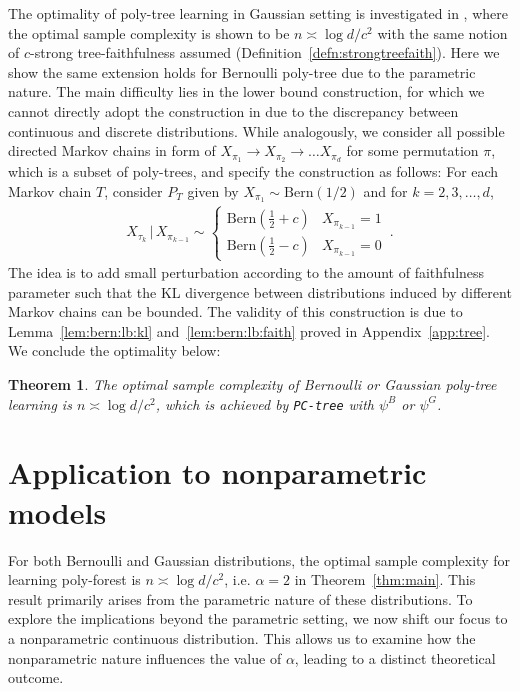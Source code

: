 \documentclass{article}
\newtheorem{theorem}{Theorem}[section]
\theoremstyle{definition}
\theoremstyle{definition}
\theoremstyle{definition}
\theoremstyle{definition}
\theoremstyle{definition}
\theoremstyle{definition}
\theoremstyle{remark}
\theoremstyle{remark}
\newcommand{\given}{\,|\,}
\newcommand{\dd}{d}
\begin{document}
The optimality of poly-tree learning in Gaussian setting is investigated in \citet{wang2024optimal}, where the optimal sample complexity is shown to be $n\asymp\log\dd / c^2$ with the same notion of $c$-strong tree-faithfulness assumed (Definition~\ref{defn:strongtreefaith}).
Here we show the same extension holds for Bernoulli poly-tree due to the parametric nature.
The main difficulty lies in the lower bound construction, for which we cannot directly adopt the construction in \citet{wang2024optimal} due to the discrepancy between continuous and discrete distributions.
While analogously, we consider all possible directed Markov chains in form of $X_{\pi_1}\to X_{\pi_2}\to \ldots X_{\pi_d}$ for some permutation $\pi$, which is a subset of poly-trees, and specify the construction as follows:
For each Markov chain $T$, consider $P_T$ given by $X_{\pi_1}\sim\text{Bern}(1/2)$ and for $k=2,3,\ldots,d$,
\begin{align}\label{eq:pltr:lb}
    X_{\tau_k} \given X_{\pi_{k-1}} \sim\begin{cases}
        \text{Bern}(\frac{1}{2}+c) & X_{\pi_{k-1}}=1 \\
        \text{Bern}(\frac{1}{2}-c) & X_{\pi_{k-1}}=0
    \end{cases}\,.
\end{align}
The idea is to add small perturbation according to the amount of faithfulness parameter such that the KL divergence between distributions induced by different Markov chains can be bounded.
The validity of this construction is due to Lemma~\ref{lem:bern:lb:kl} and~\ref{lem:bern:lb:faith} proved in Appendix~\ref{app:tree}. We conclude the optimality below:
\begin{theorem}\label{thm:tree}
    The optimal sample complexity of Bernoulli or Gaussian poly-tree learning is $n \asymp \log\dd /c^2$, which is achieved by \texttt{PC-tree} with $\psi^B$ or $\psi^G$.
\end{theorem}



\section{Application to nonparametric models}\label{sec:nonparam}
For both Bernoulli and Gaussian distributions, the optimal sample complexity for learning poly-forest is $n\asymp\log\dd / c^2$, i.e. $\alpha=2$ in Theorem~\ref{thm:main}. This result primarily arises from the parametric nature of these distributions. 
To explore the implications beyond the parametric setting, we now shift our focus to a nonparametric continuous distribution. This allows us to examine how the nonparametric nature influences the value of $\alpha$, leading to a distinct theoretical outcome.
\end{document}
